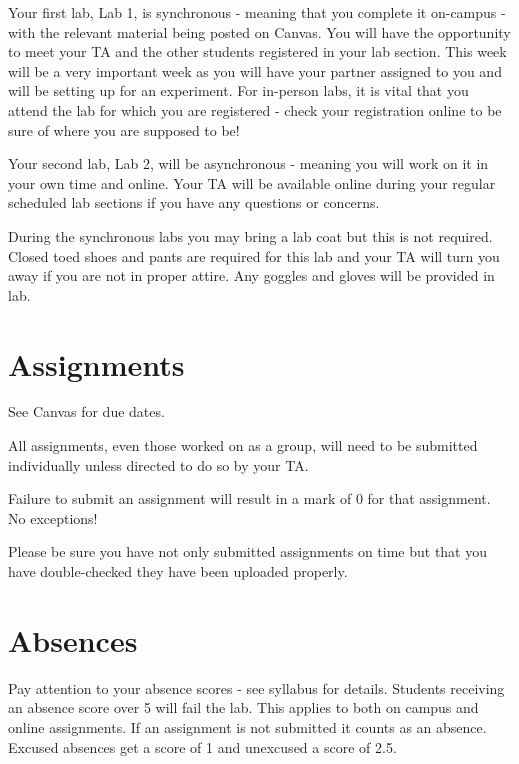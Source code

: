 \documentclass[
]{book}
\begin{document}
Your first lab, Lab 1, is synchronous - meaning that you complete it on-campus - with the relevant material being posted on Canvas. You will have the opportunity to meet your TA and the other students registered in your lab section. This week will be a very important week as you will have your partner assigned to you and will be setting up for an experiment. For in-person labs, it is vital that you attend the lab for which you are registered - check your registration online to be sure of where you are supposed to be!

Your second lab, Lab 2, will be asynchronous - meaning you will work on it in your own time and online. Your TA will be available online during your regular scheduled lab sections if you have any questions or concerns.

During the synchronous labs you may bring a lab coat but this is not required. Closed toed shoes and pants are required for this lab and your TA will turn you away if you are not in proper attire. Any goggles and gloves will be provided in lab.

\hypertarget{assignments}{%
\section*{Assignments}\label{assignments}}

See Canvas for due dates.

All assignments, even those worked on as a group, will need to be submitted individually unless directed to do so by your TA.

Failure to submit an assignment will result in a mark of 0 for that assignment. No exceptions!

Please be sure you have not only submitted assignments on time but that you have double-checked they have been uploaded properly.

\hypertarget{absences}{%
\section*{Absences}\label{absences}}

Pay attention to your absence scores - see syllabus for details. Students receiving an absence score over 5 will fail the lab. This applies to both on campus and online assignments. If an assignment is not submitted it counts as an absence. Excused absences get a score of 1 and unexcused a score of 2.5.
\end{document}
